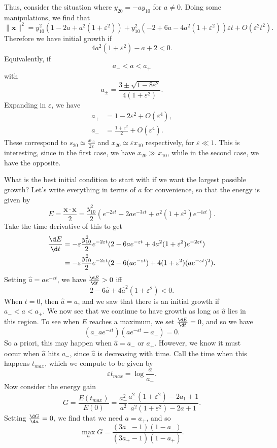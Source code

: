 \documentclass[a4paper]{article}
\begin{document}
Thus, consider the situation where $y_{20} = - a y_{10}$ for $a \not =0$. Doing some manipulations, we find that
\[
  \|\mathbf{x}\|^2 = y_{10}^2 (1 - 2a + a^2 (1 + \varepsilon^2)) + y_{10}^2 (-2 + 6a - 4a^2(1 + \varepsilon^2))\varepsilon t + O(\varepsilon^2 t^2).
\]
Therefore we have initial growth if
\[
  4a^2 (1 + \varepsilon^2) - a + 2 < 0.
\]
Equivalently, if
\[
  a_- < a < a_+
\]
with
\[
  a_{\pm} = \frac{3 \pm \sqrt{1 - 8\varepsilon^2}}{4(1 + \varepsilon^2)}.
\]
Expanding in $\varepsilon$, we have
\begin{align*}
  a_+ &= 1 - 2 \varepsilon^2 + O(\varepsilon^4),\\
  a_- &= \frac{1 + \varepsilon^2}{2} + O(\varepsilon^4).
\end{align*}
These correspond to $s_{20} \simeq \frac{x_{10}}{2\varepsilon}$ and $x_{20} \simeq \varepsilon x_{10}$ respectively, for $\varepsilon \ll 1$. This is interesting, since in the first case, we have $x_{20} \gg x_{10}$, while in the second case, we have the opposite.

What is the best initial condition to start with if we want the largest possible growth? Let's write everything in terms of $a$ for convenience, so that the energy is given by
\[
  E = \frac{\mathbf{x} \cdot \mathbf{x}}{2} = \frac{y_{10}^2}{2} (e^{-2\varepsilon t} - 2 a e^{-3 \varepsilon t} + a^2(1 + \varepsilon^2) e^{-4\varepsilon t}).
\]
Take the time derivative of this to get
\begin{align*}
  \frac{\d E}{\d t} &= - \varepsilon \frac{y_{10}^2}{2}e^{-2\varepsilon t} (2 - 6a e^{-\varepsilon t} + 4a^2(1 + \varepsilon^2) e^{-2\varepsilon t})\\
  &= - \varepsilon \frac{y_{10}^2}{2} e^{-2\varepsilon t} (2 - 6 (a e^{-\varepsilon t}) + 4 (1 + \varepsilon^2) (ae^{-\varepsilon t})^2).
\end{align*}
Setting $\hat{a} = ae^{-\varepsilon t}$, we have $\frac{\d E}{\d t} > 0$ iff
\[
  2 - 6 \hat{a} + 4 \hat{a}^2 (1 + \varepsilon^2) < 0.
\]
When $t = 0$, then $\hat{a} = a$, and we saw that there is an initial growth if $a_- < a < a_+$. We now see that we continue to have growth as long as $\hat{a}$ lies in this region. To see when $E$ reaches a maximum, we set $\frac{\d E}{\d t} = 0$, and so we have
\[
  (a_- ae^{-\varepsilon t})(ae^{-\varepsilon t} - a_+) = 0.
\]
So a priori, this may happen when $\hat{a} = a_-$ or $a_+$. However, we know it must occur when $\hat{a}$ hits $a_-$, since $\hat{a}$ is decreasing with time. Call the time when this happens $t_{max}$, which we compute to be given by
\[
  \varepsilon t_{max} = \log \frac{a}{a_-}.
\]
Now consider the energy gain
\[
  G = \frac{E(t_{max})}{E(0)} = \frac{a_-^2}{a^2} \frac{a_-^2(1 + \varepsilon^2) - 2a_1 + 1}{a^2 (1 + \varepsilon^2) - 2a + 1}.
\]
Setting $\frac{\d G}{\d a} = 0$, we find that we need $a = a_+$, and so
\[
  \max_a G = \frac{(3a_- - 1)(1 - a_-)}{(3a_+ - 1)(1 - a_+)}.
\]
\end{document}
